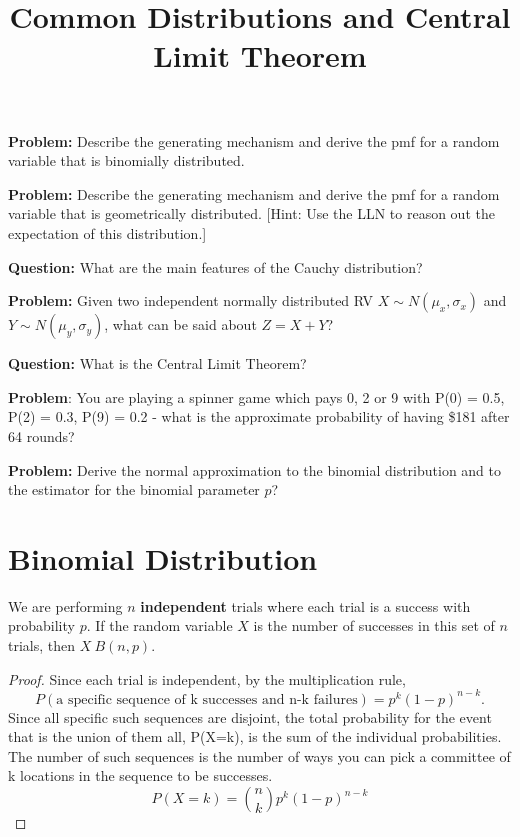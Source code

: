 




\title{Common Distributions and Central Limit Theorem}
\date{}
\maketitle

\textbf{Problem:} Describe the generating mechanism and derive the pmf for a random variable that is binomially distributed.\n

\textbf{Problem:} Describe the generating mechanism and derive the pmf for a random variable that is geometrically distributed. [Hint: Use the LLN to reason out the expectation of this distribution.]\n

\textbf{Question:} What are the main features of the Cauchy distribution?\n

\textbf{Problem:} Given two independent normally distributed RV $X \sim N(\mu_x, \sigma_x)$ and $Y \sim N(\mu_y, \sigma_y)$, what can be said about $Z = X+Y$?\n

\textbf{Question:} What is the Central Limit Theorem?\n

\textbf{Problem}: You are playing a spinner game which pays 0, 2 or 9 with P(0) = 0.5, P(2) = 0.3, P(9) = 0.2 - what is the approximate probability of having \$181 after 64 rounds?\n

\textbf{Problem:} Derive the normal approximation to the binomial distribution and to the estimator for the binomial parameter $p$?\n

\vspace{.3 in}

\tableofcontents

\section{Binomial Distribution}
We are performing $n$ \textbf{independent} trials where each trial is a success with probability $p$. If the random variable $X$ is the number of successes in this set of $n$ trials, then $X~B(n,p)$. 
\begin{proof}
Since each trial is independent, by the multiplication rule, 
\begin{equation}
P(\textrm{a specific sequence of k successes and n-k failures}) = p^k(1-p)^{n-k}.
\end{equation}
Since all specific such sequences are disjoint, the total probability for the event that is the union of them all, P(X=k), is the sum of the individual probabilities. The number of such sequences is the number of ways you can pick a committee of k locations in the sequence to be successes. 
\begin{equation}
P(X=k) = {n\choose k}  p^k(1-p)^{n-k}
\end{equation}
\end{proof}



